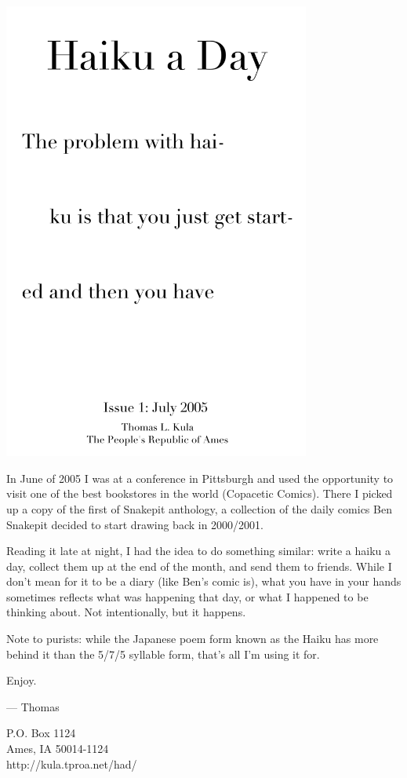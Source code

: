 \documentclass[12pt]{article}
\begin{document}
\includegraphics[width=101mm]{frontpage.png}

\newpage

In June of 2005 I was at a conference in Pittsburgh
and used the opportunity to visit one of the best
bookstores in the world (Copacetic Comics). 
There I picked up a copy
of the first of Snakepit anthology,
a collection of the daily comics Ben Snakepit
decided to start drawing back in 2000/2001.

Reading it late at night, I had the idea
to do something similar: write a haiku a
day, collect them up at the end of the month,
and send them to friends. While I don't
mean for it to be a diary (like Ben's comic
is), what you have in your hands sometimes
reflects what was happening that day, or
what I happened to be thinking about.
Not intentionally, but it happens.

Note to purists: while the Japanese poem
form known as the Haiku has more behind it
than the 5/7/5 syllable form, that's all
I'm using it for.

Enjoy.

--- Thomas

P.O. Box 1124 \\
Ames, IA 50014-1124 \\
http://kula.tproa.net/had/
\end{document}
